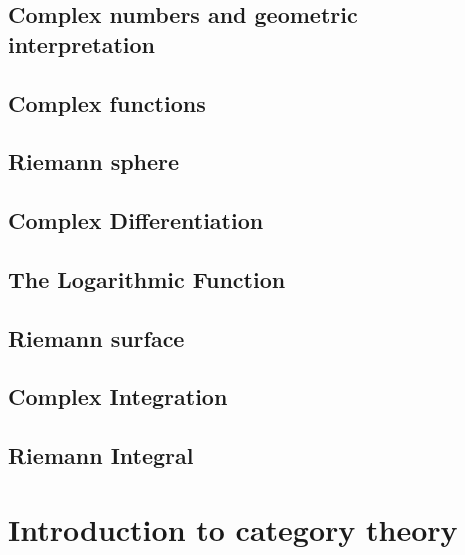 \documentclass{article}
\begin{document}
\subsection{Complex numbers and geometric interpretation}
\subsection{Complex functions}
\subsection{Riemann sphere}
\subsection{Complex Differentiation}
\subsection{The Logarithmic Function}
\subsection{Riemann surface}
\subsection{Complex Integration}























\subsection{Riemann Integral}











\section{Introduction to category theory}
\end{document}
